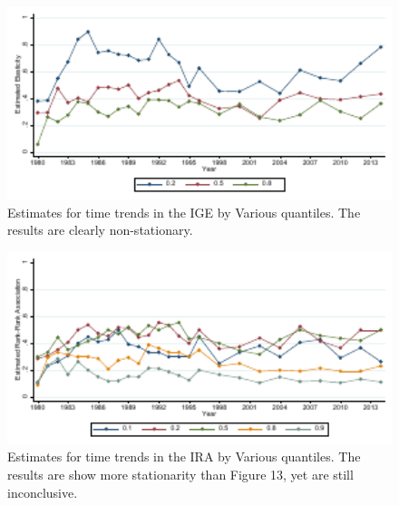 \documentclass[notitlepage,12pt]{article}
\begin{document}
\begin{figure}[H]
  \centering
  \caption{Estimates for time trends in the IGE by Various quantiles.  The results are clearly non-stationary.}
  \includegraphics[width=6in]{Graph15.pdf}
\end{figure}
\begin{figure}[H]
  \centering
  \caption{Estimates for time trends in the IRA by Various quantiles.  The results are show more stationarity than Figure 13, yet are still inconclusive.}
  \includegraphics[width=6in]{Graph14.pdf}
\end{figure}
\end{document}
